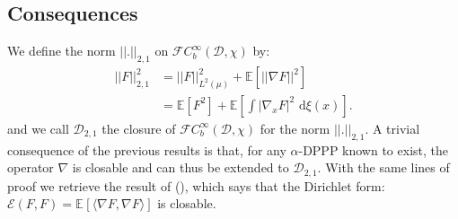 \documentclass[11pt,a4paper]{amsart}
\begin{document}
\subsection{Consequences}
\label{sec:consequences}

We define the norm $||.||_{2,1}$ on
$\mathcal{F}C^{\infty}_b(\mathcal{D},\chi)$ by:
\begin{align*}
  ||F||^2_{2,1}&=||F||^2_{L^2(\mu)}+{{\mathbb E}}\left[||\nabla F||^2\right]\\
  &={{\mathbb E}}\left[F^2\right]+{{\mathbb E}}\left[\int |\nabla_x F|^2{\text{ d}}\xi(x)\right].
\end{align*}
and we call $\mathcal{D}_{2,1}$ the closure of
$\mathcal{F}C^{\infty}_b(\mathcal{D},\chi)$ for the norm
$||.||_{2,1}$. A trivial consequence of the previous results is that,
for any $\alpha$-DPPP known to exist, the operator $\nabla$ is
closable and can thus be extended to $\mathcal{D}_{2,1}.$ With the
same lines of proof we retrieve the result of (\cite{MR2209150}),
which says that the Dirichlet form:
\begin{math}
  \mathcal{E}(F,F)={{\mathbb E}_{{}}\left[{{\langle\nabla F , \nabla F\rangle}}\right]}
\end{math}
is closable.
\end{document}
